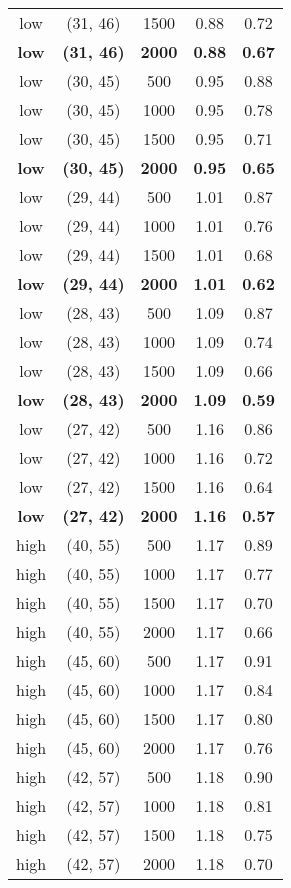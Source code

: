 \begin{tabular}{c c c c c}
low & (31, 46) &  1500 & 0.88 & 0.72 \\
\textbf{low} & \textbf{(31, 46)} & \textbf{ 2000} & \textbf{0.88} & \textbf{0.67} \\
low & (30, 45) &  500 & 0.95 & 0.88 \\
low & (30, 45) &  1000 & 0.95 & 0.78 \\
low & (30, 45) &  1500 & 0.95 & 0.71 \\
\textbf{low} & \textbf{(30, 45)} & \textbf{ 2000} & \textbf{0.95} & \textbf{0.65} \\
low & (29, 44) &  500 & 1.01 & 0.87 \\
low & (29, 44) &  1000 & 1.01 & 0.76 \\
low & (29, 44) &  1500 & 1.01 & 0.68 \\
\textbf{low} & \textbf{(29, 44)} & \textbf{ 2000} & \textbf{1.01} & \textbf{0.62} \\
low & (28, 43) &  500 & 1.09 & 0.87 \\
low & (28, 43) &  1000 & 1.09 & 0.74 \\
low & (28, 43) &  1500 & 1.09 & 0.66 \\
\textbf{low} & \textbf{(28, 43)} & \textbf{ 2000} & \textbf{1.09} & \textbf{0.59} \\
low & (27, 42) &  500 & 1.16 & 0.86 \\
low & (27, 42) &  1000 & 1.16 & 0.72 \\
low & (27, 42) &  1500 & 1.16 & 0.64 \\
\textbf{low} & \textbf{(27, 42)} & \textbf{ 2000} & \textbf{1.16} & \textbf{0.57} \\
high & (40, 55) &  500 & 1.17 & 0.89 \\
high & (40, 55) &  1000 & 1.17 & 0.77 \\
high & (40, 55) &  1500 & 1.17 & 0.70 \\
high & (40, 55) &  2000 & 1.17 & 0.66 \\
high & (45, 60) &  500 & 1.17 & 0.91 \\
high & (45, 60) &  1000 & 1.17 & 0.84 \\
high & (45, 60) &  1500 & 1.17 & 0.80 \\
high & (45, 60) &  2000 & 1.17 & 0.76 \\
high & (42, 57) &  500 & 1.18 & 0.90 \\
high & (42, 57) &  1000 & 1.18 & 0.81 \\
high & (42, 57) &  1500 & 1.18 & 0.75 \\
high & (42, 57) &  2000 & 1.18 & 0.70 \\

\end{tabular}
